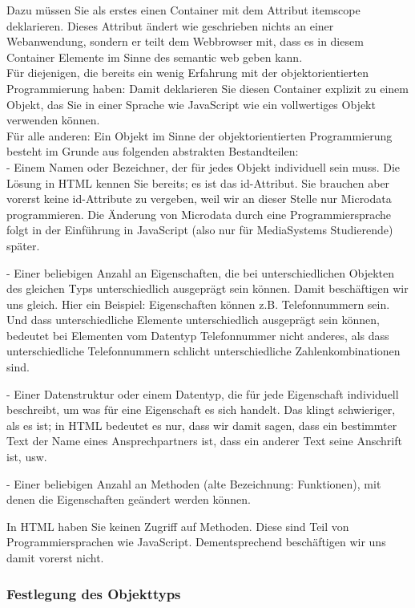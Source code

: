 Dazu müssen Sie als erstes einen Container mit dem Attribut itemscope deklarieren. Dieses Attribut ändert wie geschrieben nichts an einer Webanwendung, sondern er teilt dem Webbrowser mit, dass es in diesem Container Elemente im Sinne des semantic web geben kann.\\

Für diejenigen, die bereits ein wenig Erfahrung mit der objektorientierten Programmierung haben: Damit deklarieren Sie diesen Container explizit zu einem Objekt, das Sie in einer Sprache wie JavaScript wie ein vollwertiges Objekt verwenden können.\\

Für alle anderen: Ein Objekt im Sinne der objektorientierten Programmierung besteht im Grunde aus folgenden abstrakten Bestandteilen:\\

-	Einem Namen oder Bezeichner, der für jedes Objekt individuell sein muss.
Die Lösung in HTML kennen Sie bereits; es ist das id-Attribut. Sie brauchen aber vorerst keine id-Attribute zu vergeben, weil wir an dieser Stelle nur Microdata programmieren. Die Änderung von Microdata durch eine Programmiersprache folgt in der Einführung in JavaScript (also nur für MediaSystems Studierende) später.

-	Einer beliebigen Anzahl an Eigenschaften, die bei unterschiedlichen Objekten des gleichen Typs unterschiedlich ausgeprägt sein können.
Damit beschäftigen wir uns gleich. Hier ein Beispiel: Eigenschaften können z.B. Telefonnummern sein. Und dass unterschiedliche Elemente unterschiedlich ausgeprägt sein können, bedeutet bei Elementen vom Datentyp Telefonnummer nicht anderes, als dass unterschiedliche Telefonnummern schlicht unterschiedliche Zahlenkombinationen sind.

-	Einer Datenstruktur oder einem Datentyp, die für jede Eigenschaft individuell beschreibt, um was für eine Eigenschaft es sich handelt.
Das klingt schwieriger, als es ist; in HTML bedeutet es nur, dass wir damit sagen, dass ein bestimmter Text der Name eines Ansprechpartners ist, dass ein anderer Text seine Anschrift ist, usw.

-	Einer beliebigen Anzahl an Methoden (alte Bezeichnung: Funktionen), mit denen die Eigenschaften geändert werden können.

In HTML haben Sie keinen Zugriff auf Methoden. Diese sind Teil von Programmiersprachen wie JavaScript. Dementsprechend beschäftigen wir uns damit vorerst nicht.

\subsubsection{Festlegung des Objekttyps}

